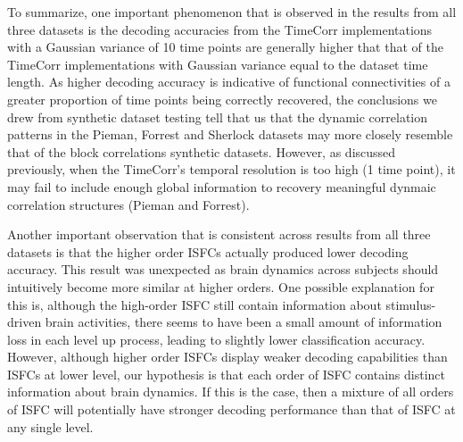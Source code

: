 \documentclass[11pt]{article}
\begin{document}
\begin{enumerate}
To summarize, one important phenomenon that is observed in the results from all three datasets is the decoding accuracies from the TimeCorr implementations with a Gaussian variance of 10 time points are generally higher that that of the TimeCorr implementations with Gaussian variance equal to the dataset time length. As higher decoding accuracy is indicative of functional connectivities of a greater proportion of time points being correctly recovered, the conclusions we drew from synthetic dataset testing tell that us that the dynamic correlation patterns in the Pieman, Forrest and Sherlock datasets may more closely resemble that of the block correlations synthetic datasets. However, as discussed previously, when the TimeCorr's temporal resolution is too high (1 time point), it may fail to include enough global information to recovery meaningful dynmaic correlation structures (Pieman and Forrest).

Another important observation that is consistent across results from all three datasets is that the higher order ISFCs actually produced lower decoding accuracy. This result was unexpected as brain dynamics across subjects should intuitively become more similar at higher orders. One possible explanation for this is, although the high-order ISFC still contain information about stimulus-driven brain activities, there seems to have been a small amount of information loss in each level up process, leading to slightly lower classification accuracy. However, although higher order ISFCs display weaker decoding capabilities than ISFCs at lower level, our hypothesis is that each order of ISFC contains distinct information about brain dynamics. If this is the case, then a mixture of all orders of ISFC will potentially have stronger decoding performance than that of ISFC at any single level.


\end{enumerate}
\end{document}

